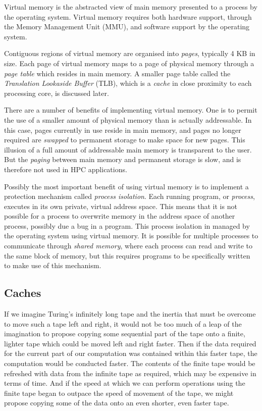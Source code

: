 Virtual memory is the abstracted view of main memory presented to a process by the operating system. Virtual memory requires both hardware support, through the Memory Management Unit (MMU), and software support by the operating system.

Contiguous regions of virtual memory are organised into \emph{pages}, typically 4 KB in size. Each page of virtual memory maps to a page of physical memory through a \emph{page table} which resides in main memory. A smaller page table called the \emph{Translation Lookaside Buffer} (TLB), which is a \emph{cache} in close proximity to each processing core, is discussed later.

There are a number of benefits of implementing virtual memory. One is to permit the use of a smaller amount of physical memory than is actually addressable. In this case, pages currently in use reside in main memory, and pages no longer required are \emph{swapped} to permanent storage to make space for new pages. This illusion of a full amount of addressable main memory is transparent to the user. But the \emph{paging} between main memory and permanent storage is slow, and is therefore not used in HPC applications.

Possibly the most important benefit of using virtual memory is to implement a protection mechanism called \emph{process isolation}. Each running program, or \emph{process}, executes in its own private, virtual address space. This means that it is not possible for a process to overwrite memory in the address space of another process, possibly due a bug in a program. This process isolation in managed by the operating system using virtual memory. It is possible for multiple processes to communicate through \emph{shared memory}, where each process can read and write to the same block of memory, but this requires programs to be specifically written to make use of this mechanism. 

  
\subsection{Caches}

If we imagine Turing's infinitely long tape and the inertia that must be overcome to move such a tape left and right, it would not be too much of a leap of the imagination to propose copying some sequential part of the tape onto a finite, lighter tape which could be moved left and right faster. Then if the data required for the current part of our computation was contained within this faster tape, the computation would be conducted faster. The contents of the finite tape would be refreshed with data from the infinite tape as required, which may be expensive in terms of time. And if the speed at which we can perform operations using the finite tape began to outpace the speed of movement of the tape, we might propose copying some of the data onto an even shorter, even faster tape.

